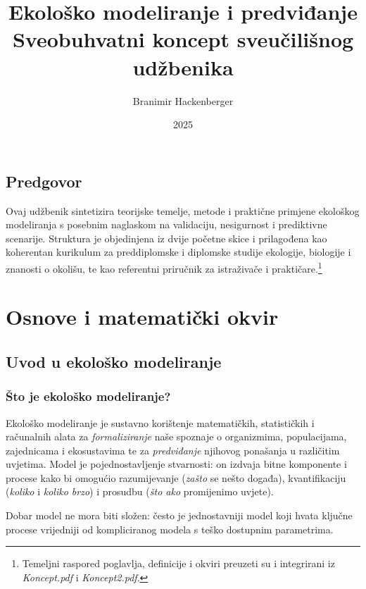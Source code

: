 \documentclass[12pt,oneside]{book}
\title{Ekološko modeliranje i predviđanje\\[4pt]\large Sveobuhvatni koncept sveučilišnog udžbenika}
\author{Branimir Hackenberger}
\date{2025}
\begin{document}
	\frontmatter
	\maketitle
	\tableofcontents
	
	\chapter*{Predgovor}
	Ovaj udžbenik sintetizira teorijske temelje, metode i praktične primjene ekološkog
	modeliranja s posebnim naglaskom na validaciju, nesigurnost i prediktivne scenarije.
	Struktura je objedinjena iz dvije početne skice i prilagođena kao koherentan kurikulum
	za preddiplomske i diplomske studije ekologije, biologije i znanosti o okolišu, te kao
	referentni priručnik za istraživače i praktičare.\footnote{Temeljni raspored poglavlja,
		definicije i okviri preuzeti su i integrirani iz \textit{Koncept.pdf} i \textit{Koncept2.pdf}.}
	
	\mainmatter
	
	\part{Osnove i matematički okvir}
	
	\chapter{Uvod u ekološko modeliranje}
	\label{ch:uvod}
	
	\section{Što je ekološko modeliranje?}
	\label{sec:sto-je-modeliranje}
	
	Ekološko modeliranje je sustavno korištenje matematičkih, statističkih i računalnih alata za \emph{formaliziranje} naše spoznaje o organizmima, populacijama, zajednicama i ekosustavima te za \emph{predviđanje} njihovog ponašanja u različitim uvjetima. Model je pojednostavljenje stvarnosti: on izdvaja bitne komponente i procese kako bi omogućio razumijevanje (\emph{zašto} se nešto događa), kvantifikaciju (\emph{koliko} i \emph{koliko brzo}) i prosudbu (\emph{što ako} promijenimo uvjete).
	
	\begin{tcolorbox}[colback=blue!5,colframe=blue!50!black,title={Savjet}]
		Dobar model ne mora biti složen: često je jednostavniji model koji hvata ključne procese
		vrijedniji od kompliciranog modela s teško dostupnim parametrima.
	\end{tcolorbox}
	
\end{document}
